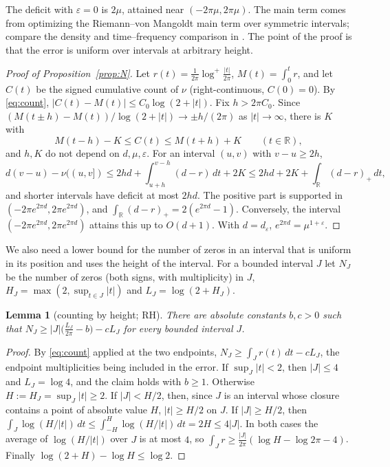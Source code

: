 \documentclass[11pt]{amsart}
\newtheorem{lemma}[proposition]{Lemma}
\theoremstyle{definition}
\theoremstyle{remark}
\numberwithin{equation}{section}
\newcommand{\R}{\mathbb{R}}
\begin{document}
The deficit with $\varepsilon=0$ is $2\mu$, attained near $(-2\pi\mu,2\pi\mu)$. The main term comes from optimizing the Riemann--von Mangoldt main term over symmetric intervals; compare the density and time--frequency comparison in \cite{Kulikov21}. The point of the proof is that the error is uniform over intervals at arbitrary height.

\begin{proof}[Proof of Proposition~\ref{prop:N}]
Let $r(t)=\frac1{2\pi}\log^+\frac{|t|}{2\pi}$, $M(t)=\int_0^tr$, and let $C(t)$ be the signed cumulative count of $\nu$ (right-continuous, $C(0)=0$). By \eqref{eq:count}, $|C(t)-M(t)|\le C_0\log(2+|t|)$. Fix $h>2\pi C_0$. Since $(M(t\pm h)-M(t))/\log(2+|t|)\to\pm h/(2\pi)$ as $|t|\to\infty$, there is $K$ with
\[
M(t-h)-K\le C(t)\le M(t+h)+K\qquad(t\in\R),
\]
and $h,K$ do not depend on $d,\mu,\varepsilon$. For an interval $(u,v)$ with $v-u\ge2h$,
\[
d(v-u)-\nu((u,v])\le2hd+\int_{u+h}^{v-h}(d-r)\,dt+2K\le2hd+2K+\int_\R(d-r)_+\,dt,
\]
and shorter intervals have deficit at most $2hd$. The positive part is supported in $(-2\pi e^{2\pi d},2\pi e^{2\pi d})$, and $\int_\R(d-r)_+=2(e^{2\pi d}-1)$. Conversely, the interval $(-2\pi e^{2\pi d},2\pi e^{2\pi d})$ attains this up to $O(d+1)$. With $d=d_\varepsilon$, $e^{2\pi d}=\mu^{1+\varepsilon}$.
\end{proof}

We also need a lower bound for the number of zeros in an interval that is uniform in its position and uses the height of the interval. For a bounded interval $J$ let $N_J$ be the number of zeros (both signs, with multiplicity) in $J$, $H_J=\max(2,\sup_{t\in J}|t|)$ and $L_J=\log(2+H_J)$.

\begin{lemma}[counting by height; RH]\label{lem:height}
There are absolute constants $b,c>0$ such that $N_J\ge|J|\bigl(\frac{L_J}{2\pi}-b\bigr)-cL_J$ for every bounded interval $J$.
\end{lemma}
\begin{proof}
By \eqref{eq:count} applied at the two endpoints, $N_J\ge\int_Jr(t)\,dt-cL_J$, the endpoint multiplicities being included in the error. If $\sup_J|t|<2$, then $|J|\le4$ and $L_J=\log4$, and the claim holds with $b\ge1$. Otherwise $H:=H_J=\sup_J|t|\ge2$. If $|J|<H/2$, then, since $J$ is an interval whose closure contains a point of absolute value $H$, $|t|\ge H/2$ on $J$. If $|J|\ge H/2$, then $\int_J\log(H/|t|)\,dt\le\int_{-H}^H\log(H/|t|)\,dt=2H\le4|J|$. In both cases the average of $\log(H/|t|)$ over $J$ is at most $4$, so $\int_Jr\ge\frac{|J|}{2\pi}(\log H-\log2\pi-4)$. Finally $\log(2+H)-\log H\le\log2$.
\end{proof}
\end{document}

